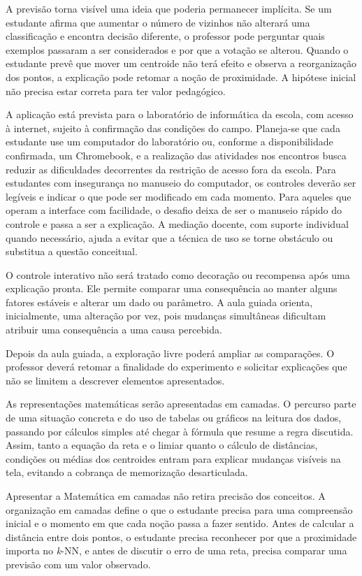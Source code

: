 A previsão torna visível uma ideia que poderia permanecer implícita. Se um estudante afirma que aumentar o número de vizinhos não alterará uma classificação e encontra decisão diferente, o professor pode perguntar quais exemplos passaram a ser considerados e por que a votação se alterou. Quando o estudante prevê que mover um centroide não terá efeito e observa a reorganização dos pontos, a explicação pode retomar a noção de proximidade. A hipótese inicial não precisa estar correta para ter valor pedagógico.

A aplicação está prevista para o laboratório de informática da escola, com acesso à internet, sujeito à confirmação das condições do campo. Planeja-se que cada estudante use um computador do laboratório ou, conforme a disponibilidade confirmada, um Chromebook, e a realização das atividades nos encontros busca reduzir as dificuldades decorrentes da restrição de acesso fora da escola. Para estudantes com insegurança no manuseio do computador, os controles deverão ser legíveis e indicar o que pode ser modificado em cada momento. Para aqueles que operam a interface com facilidade, o desafio deixa de ser o manuseio rápido do controle e passa a ser a explicação. A mediação docente, com suporte individual quando necessário, ajuda a evitar que a técnica de uso se torne obstáculo ou substitua a questão conceitual.

O controle interativo não será tratado como decoração ou recompensa após uma explicação pronta. Ele permite comparar uma consequência ao manter alguns fatores estáveis e alterar um dado ou parâmetro. A aula guiada orienta, inicialmente, uma alteração por vez, pois mudanças simultâneas dificultam atribuir uma consequência a uma causa percebida.

Depois da aula guiada, a exploração livre poderá ampliar as comparações. O professor deverá retomar a finalidade do experimento e solicitar explicações que não se limitem a descrever elementos apresentados.

As representações matemáticas serão apresentadas em camadas. O percurso parte de uma situação concreta e do uso de tabelas ou gráficos na leitura dos dados, passando por cálculos simples até chegar à fórmula que resume a regra discutida. Assim, tanto a equação da reta e o limiar quanto o cálculo de distâncias, condições ou médias dos centroides entram para explicar mudanças visíveis na tela, evitando a cobrança de memorização desarticulada.

Apresentar a Matemática em camadas não retira precisão dos conceitos. A organização em camadas define o que o estudante precisa para uma compreensão inicial e o momento em que cada noção passa a fazer sentido. Antes de calcular a distância entre dois pontos, o estudante precisa reconhecer por que a proximidade importa no \textit{k}-NN, e antes de discutir o erro de uma reta, precisa comparar uma previsão com um valor observado.


